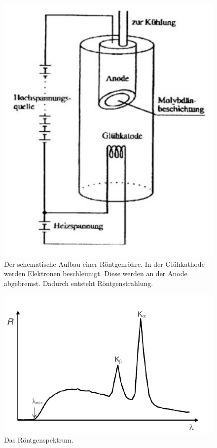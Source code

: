 \documentclass{article}
\begin{document}
\begin{figure}[H]
\includegraphics[scale=1.8]{roehre.png}
\caption{Der schematische Aufbau einer Röntgenröhre. In der Glühkathode werden Elektronen beschleunigt. Diese werden an der Anode abgebremst. Dadurch entsteht Röntgenstrahlung.}
\label{fig:roentgenroehre}
\end{figure}



\begin{figure}[H]
\includegraphics[scale=1.8]{alpha_beta.png}
\caption{Das Röntgenspektrum.}
\label{fig:roentgenspektrum}
\end{figure}
\end{document}
